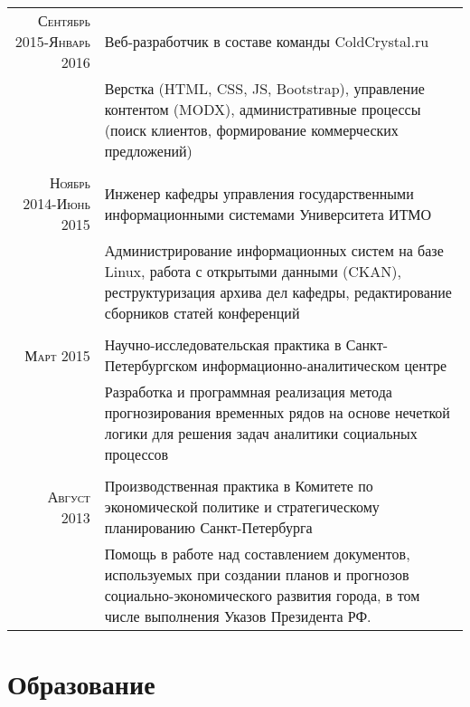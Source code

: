 \documentclass[a4paper,10pt]{article} %
\begin{document}
\begin{tabular}{r|p{11cm}}
    \textsc{Сентябрь 2015-Январь 2016} & Веб-разработчик в составе команды
    ColdCrystal.ru\\
    & \footnotesize{Верстка (HTML, CSS, JS, Bootstrap), управление контентом
        (MODX), административные процессы (поиск клиентов, формирование
        коммерческих предложений)}\\
\multicolumn{2}{c}{} \\
    \textsc{Ноябрь 2014-Июнь 2015} & Инженер кафедры управления государственными
    информационными системами Университета ИТМО\\
    & \footnotesize{Администрирование информационных систем на базе Linux,
        работа с открытыми данными (CKAN), реструктуризация архива дел кафедры,
        редактирование сборников статей конференций}\\
\multicolumn{2}{c}{} \\
\textsc{Март 2015} & Научно-исследовательская практика в Санкт-Петербургском
информационно-аналитическом центре\\
& \footnotesize{Разработка и программная реализация метода прогнозирования временных рядов на основе нечеткой
    логики для решения задач аналитики социальных процессов}\\
\multicolumn{2}{c}{} \\


\textsc{Август 2013} & Производственная практика в Комитете по экономической политике и
стратегическому планированию Санкт-Петербурга \\
& \footnotesize{Помощь в работе над составлением документов, используемых при
    создании
    планов и прогнозов социально-экономического развития города, в том числе выполнения Указов Президента РФ.}
\end{tabular}


\section{Образование}
\end{document}
